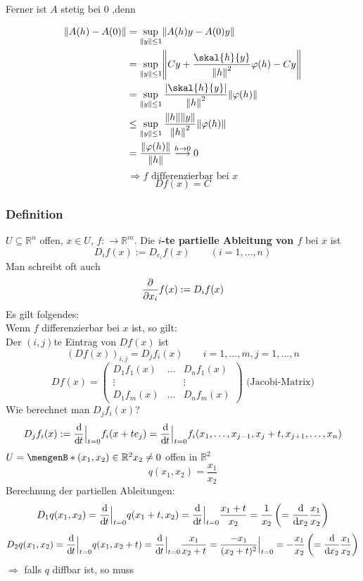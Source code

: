 Ferner ist $A$ stetig bei $0$ ,denn

\begin{align*}
	\norm{A(h)-A(0)} &= \sup\limits_{\norm{y}\leq 1} \norm{A(h)y- A(0)y} \\
			&= \sup\limits_{\norm{y}\leq 1} \norm{Cy + \frac{\skal{h}{y}}{\norm{h}^2} \varphi(h) - Cy } \\
			&= \sup\limits_{\norm{y}\leq 1} \frac{\abs{\skal{h}{y}}}{\norm{h}^2} \norm{\varphi(h)} \\
			&\leq \sup\limits_{\norm{y}\leq 1} \frac{\norm{h}\norm{y}}{\norm{h}^2} \norm{\varphi(h)} \\
			&=\frac{\norm{\varphi(h)}}{\norm{h}} \stackrel{h \to 0}{\longrightarrow} 0
\end{align*}
\[
	\Rightarrow f \text{ differenzierbar bei }x
\]
\[
	Df(x)=C
\]
\subsubsection{Definition} %
\label{ssub:definition}
$U \subseteq \mathbb{R}^n$ offen, $x \in U$, $f:  \to \mathbb{R}^m$. Die {\bfseries $i$-te partielle Ableitung von $f$} bei $x$ ist
\[
	D_if(x):= D_{e_i}f(x) \qquad (i=1,\dots,n)
\]
Man schreibt oft auch \[
	\frac{{\partial }}{{\partial x_i}} f(x):= D_if(x)
\]
Es gilt folgendes: \\
Wenn $f$ differenzierbar bei $x$ ist, so gilt: \\
Der $(i,j)$te Eintrag von $Df(x)$ ist \[
	(Df(x))_{i,j}=D_jf_i(x) \qquad i=1,\dots,m , j=1,\dots,n
\]
\[
	Df(x)= \begin{pmatrix}
		D_1f_1(x) & \dots & D_nf_1(x) \\
		\vdots & & \vdots \\
		D_1f_m(x) & \dots & D_nf_m(x)
	\end{pmatrix} \text{ (Jacobi-Matrix)}
\]
Wie berechnet man $D_jf_i(x)$?
\[
	D_jf_i(x):=  \frac{\mathrm{d}\mkern-1.0mu }{\mathrm{d}\mkern-1.0mu t}  \Big|_{t=0}f_i(x+te_j)= \frac{\mathrm{d}\mkern-1.0mu }{\mathrm{d}\mkern-1.0mu t}  \Big|_{t=0}f_i(x_1,\dots,x_{j-1},x_j+t,x_{j+1},\dots,x_n)
\]
 $U= \set[(x_1,x_2) \in \mathbb{R}^2]{x_2 \not= 0}$ offen in $\mathbb{R}^2$ 
\[
	q(x_1,x_2)= \frac{x_1}{x_2}
\]
Berechnung der partiellen Ableitungen:
\[
	D_1q(x_1,x_2)= \frac{\mathrm{d}\mkern-1.0mu }{\mathrm{d}\mkern-1.0mu t}  \Big|_{t=0} q(x_1+t,x_2)= \frac{\mathrm{d}\mkern-1.0mu }{\mathrm{d}\mkern-1.0mu t}  \Big|_{t=0} \frac{x_1+t}{x_2} = \frac{1}{x_2} \left(= \frac{\mathrm{d}\mkern-1.0mu }{\mathrm{d}\mkern-1.0mu x_2}  \frac{x_1}{x_2} \right)
\]
\[
	D_2q(x_1,x_2)= \frac{\mathrm{d}\mkern-1.0mu }{\mathrm{d}\mkern-1.0mu t}   \Big|_{t=0} q(x_1,x_2+t)= \frac{\mathrm{d}\mkern-1.0mu }{\mathrm{d}\mkern-1.0mu t}   \Big|_{t=0} \frac{x_1}{x_2+t} = \frac{-x_1}{(x_2+t)^2}  \Big|_{t=0}^{} = - \frac{x_1}{x_2} 
	\left( = \frac{\mathrm{d}\mkern-1.0mu }{\mathrm{d}\mkern-1.0mu x_2}  \frac{x_1}{x_2}  \right)
\]
$\Rightarrow$ falls $q$ diffbar ist, so muss
